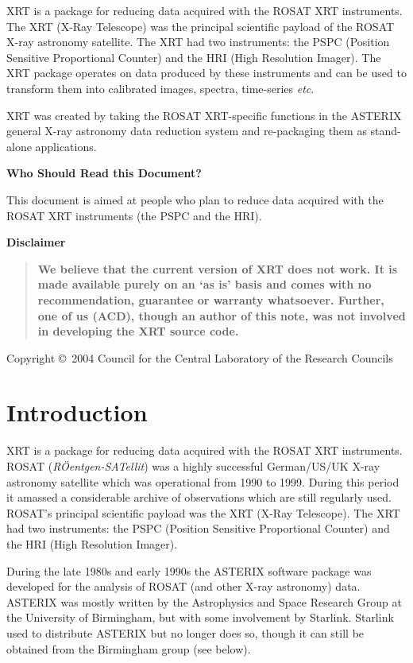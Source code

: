 \documentclass[twoside,11pt]{article}
\newcommand{\stardocinitials}  {SUN}
\newcommand{\stardoccopyright}
{Copyright \copyright\ 2004 Council for the Central Laboratory of the
Research Councils}
\newcommand{\stardocnumber}    {247.1}
\newcommand{\stardocabstract}  {
XRT is a package for reducing data acquired with the ROSAT XRT
instruments.  The XRT (X-Ray Telescope) was the principal scientific
payload of the ROSAT X-ray astronomy satellite.  The XRT had two
instruments: the PSPC (Position Sensitive Proportional Counter) and the
HRI (High Resolution Imager).  The XRT package operates on data produced
by these instruments and can be used to transform them into calibrated
images, spectra, time-series \emph{etc}.

XRT was created by taking the ROSAT XRT-specific functions in the ASTERIX
general X-ray astronomy data reduction system and re-packaging them as
stand-alone applications.

\begin{latexonly}
\vspace{2mm}
\end{latexonly}

\begin{center}
{\bf Who Should Read this Document?}
\end{center}

This document is aimed at people who plan to reduce data acquired with
the ROSAT XRT instruments (the PSPC and the HRI).

\begin{latexonly}
\vspace{2mm}
\end{latexonly}

\begin{center}
{\bf Disclaimer}
\end{center}

\begin{quote}
{\bf We believe that the current version of XRT does not work.  It is
made available purely on an `as is' basis and comes with no
recommendation, guarantee or warranty whatsoever.  Further, one of us
(ACD), though an author of this note, was not involved in developing the
XRT source code.}
\end{quote}}
\newcommand{\stardocname}{\stardocinitials /\stardocnumber}
\newcommand{\htmladdnormallink}[2]{#1}
\newenvironment{latexonly}{}{}
\newcommand{\xlabel}[1]{}
\renewcommand{\_}{\texttt{\symbol{95}}}
\renewcommand{\thepage}{\roman{page}}
\begin{document}
\stardocabstract

\begin{latexonly}
\vspace*{\fill}
\stardoccopyright
\end{latexonly}


\newpage
\renewcommand{\thepage}{\arabic{page}}
\setcounter{page}{1}

\section{\xlabel{INTRO}\label{INTRO}Introduction}

XRT is a package for reducing data acquired with the ROSAT XRT instruments.
\htmladdnormallink{ROSAT}{http://ledas-www.star.le.ac.uk/rosat-goc/index.html}
({\it R\"{O}entgen-SATellit}\/) was a highly successful German/US/UK
X-ray astronomy satellite which was operational from 1990 to 1999.
During this period it amassed a considerable archive of observations which
are still regularly used.  ROSAT's principal scientific payload was the
XRT (X-Ray Telescope).  The XRT had two instruments: the PSPC (Position
Sensitive Proportional Counter) and the HRI (High Resolution Imager).

During the late 1980s and early 1990s the
\htmladdnormallink{ASTERIX}{http://www.sr.bham.ac.uk/asterix/}
software package was developed for the analysis of ROSAT (and other X-ray
astronomy) data.  ASTERIX was mostly written by the
\htmladdnormallink{Astrophysics and Space Research Group}
{http://www.sr.bham.ac.uk/}
at the University of Birmingham, but with some involvement by Starlink.
Starlink used to distribute ASTERIX but no longer does so, though it
can still be obtained from the Birmingham group (see below).
\end{document}
